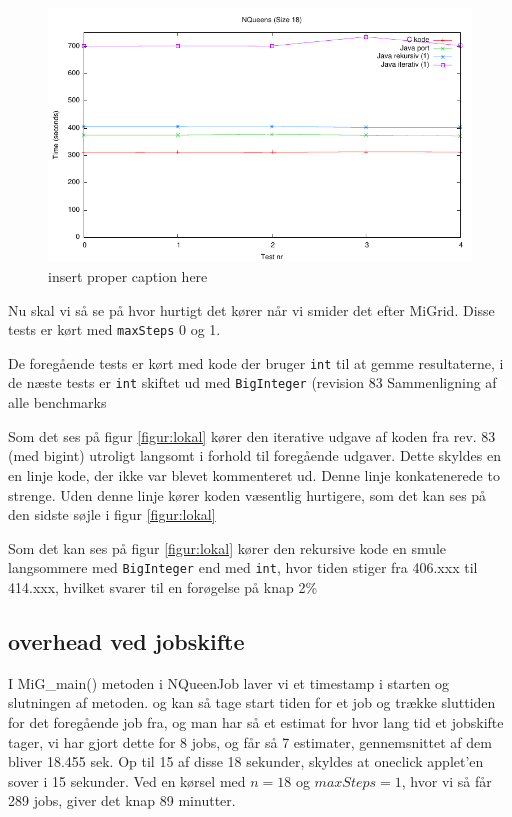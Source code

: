 \begin{figure}[h]
\begin{center}
\includegraphics{../benchmarks/b1.pdf}
\caption{insert proper caption here } 
\label{figur:b1}
\end{center}
\end{figure}

Nu skal vi så se på hvor hurtigt det kører når vi smider det efter MiGrid. 
Disse tests er kørt med \texttt{maxSteps} 0 og 1.

De foregående tests er kørt med kode der bruger \texttt{int} til at gemme resultaterne,
i de næste tests er \texttt{int} skiftet ud med \texttt{BigInteger} (revision
83
\clearpage
Sammenligning af alle benchmarks

Som det ses på figur \ref{figur:lokal} kører den iterative udgave af koden fra
rev. 83 (med bigint) utroligt langsomt i forhold til foregående udgaver.  Dette
skyldes en en linje kode, der ikke var blevet kommenteret ud. Denne linje
konkatenerede to strenge. Uden denne linje kører koden væsentlig hurtigere, som
det kan ses på den sidste søjle i figur \ref{figur:lokal}


Som det kan ses på figur \ref{figur:lokal} kører den rekursive kode en smule
langsommere med \texttt{BigInteger} end med \texttt{int}, hvor tiden stiger fra
406.xxx til 414.xxx, hvilket svarer til en forøgelse
på knap 2\%

\subsection{overhead ved jobskifte}

I MiG\_main() metoden i NQueenJob laver vi et timestamp i starten og slutningen
af metoden.  og kan så tage start tiden for et job og trække sluttiden for det
foregående job fra, og man har så et estimat for hvor lang tid et jobskifte
tager, vi har gjort dette for 8 jobs, og får så 7 estimater, gennemsnittet af
dem bliver 18.455 sek.  Op til 15 af disse 18 sekunder, skyldes at oneclick
applet'en sover i 15 sekunder.  Ved en kørsel med $n=18$ og $maxSteps=1$, hvor
vi så får 289 jobs, giver det knap 89 minutter. 

